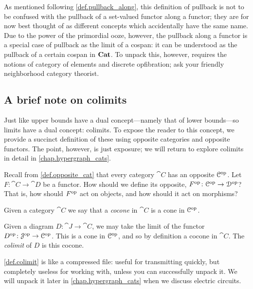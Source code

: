\documentclass[7Sketches]{subfiles}
\begin{document}
\begin{remark} \label{rem.pullbackpullback}
  As mentioned following \cref{def.pullback_along}, this definition of pullback
  is not to be confused with the pullback of a set-valued functor along a
  functor; they are for now best thought of as different concepts which
  accidentally have the same name. Due to the power of the primordial ooze,
  however, the pullback along a functor is a special case of pullback as the
  limit of a cospan: it can be understood as the pullback of a certain cospan in
  $\mathbf{Cat}$.  To unpack this, however, requires the notions of category of
  elements and discrete opfibration; ask your friendly neighborhood category
  theorist.
\end{remark}
%

\subsection{A brief note on colimits}
%
\label{subsec.brief_colimits}%
Just like upper bounds have a dual concept---namely that of lower bounds---so
limits have a dual concept: colimits. To expose the reader to this concept, we
provide a succinct definition of these using opposite categories and opposite
functors. The point, however, is just exposure; we will return to explore
colimits in detail in \cref{chap.hypergraph_cats}.%

\begin{exercise}%
\label{exc.opposite_functor}
Recall from \cref{def.opposite_cat} that every category $\cat{C}$ has an
opposite $\mathcal{C}^{\textnormal{op}}$. Let $F\colon \cat{C} \to \cat{D}$ be a functor. How
should we define its opposite, $F^{\textnormal{op}}\colon \mathcal{C}^{\textnormal{op}} \to \mathcal{D}^{\textnormal{op}}$? That is,
how should $F^{\textnormal{op}}$ act on objects, and how should it act on morphisms?
\end{exercise}


\begin{definition}%
\label{def.colimit}%
Given a category $\cat{C}$ we say that a \emph{cocone} in $\cat{C}$ is a cone
in $\mathcal{C}^{\textnormal{op}}$.

Given a diagram $D \colon \cat{J} \to \cat{C}$, we may take the limit of the
functor $D^{\textnormal{op}} \colon \mathcal{J}^{\textnormal{op}} \to \mathcal{C}^{\textnormal{op}}$. This is a cone in $\mathcal{C}^{\textnormal{op}}$,
and so by definition a cocone in $\cat{C}$. The \emph{colimit} of $D$ is this
cocone.
\end{definition}

\cref{def.colimit} is like a compressed file: useful for transmitting quickly, but completely useless for working with, unless you can successfully unpack it. We will unpack it later in \cref{chap.hypergraph_cats} when we discuss electric circuits. 
\end{document}
